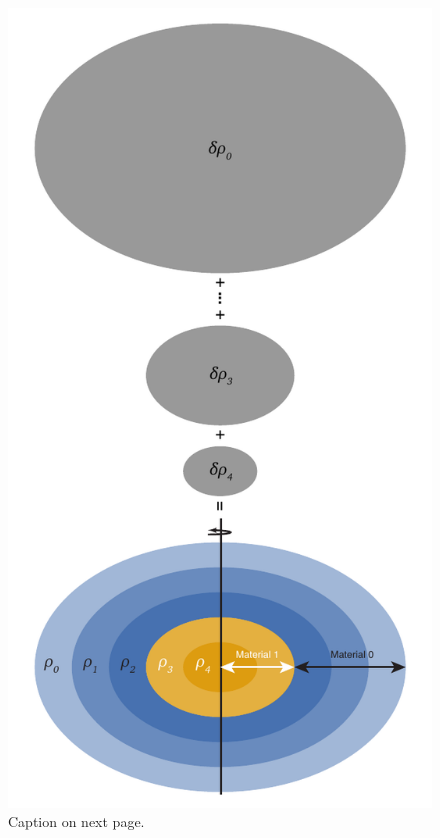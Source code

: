 \documentclass[11pt, oneside]{article}   	%
\begin{document}
\begin{figure}
\centering
\includegraphics[scale=0.8333333]{Figures/HERCULES_schematic4.pdf}
\caption{Caption on next page.}
\end{figure}
\setcounter{figure}{1}
\end{document}
